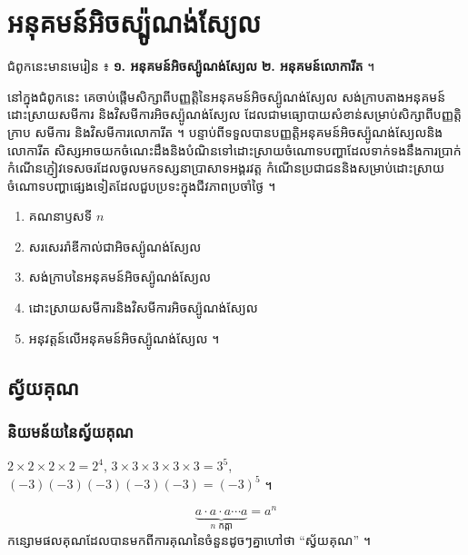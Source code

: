 \chapter{អនុគមន៍អិចស្ប៉ូណង់ស្យែល}

\begin{note}
ជំពូកនេះមានមេរៀន ៖ \textbf{១. អនុគមន៍អិចស្ប៉ូណង់ស្យែល} \quad \textbf{២. អនុគមន៍លោការីត} ។

នៅក្នុងជំពូកនេះ គេចាប់ផ្ដើមសិក្សាពីបញ្ញត្តិនៃអនុគមន៍អិចស្ប៉ូណង់ស្យែល សង់ក្រាបតាងអនុគមន៍ ដោះស្រាយសមីការ និងវិសមីការអិចស្ប៉ូណង់ស្យែល ដែលជាមធ្យោបាយសំខាន់សម្រាប់សិក្សាពីបញ្ញត្តិ ក្រាប សមីការ និងវិសមីការលោការីត ។ បន្ទាប់ពីទទួលបានបញ្ញត្តិអនុគមន៍អិចស្ប៉ូណង់ស្យែលនិងលោការីត សិស្សអាចយកចំណេះដឹងនិងបំណិនទៅដោះស្រាយចំណោទបញ្ហាដែលទាក់ទងនឹងការប្រាក់ កំណើនភ្ញៀវទេសចរដែលចូលមកទស្សនាប្រាសាទអង្គរវត្ត កំណើនប្រជាជននិងសម្រាប់ដោះស្រាយចំណោទបញ្ហាផ្សេងទៀតដែលជួបប្រទះក្នុងជីវភាពប្រចាំថ្ងៃ ។
\end{note}

\begin{objBox}[វត្ថុបំណង]
\begin{enumerate}[1]
  \item គណនាឫសទី $n$
  \item សរសេររ៉ាឌីកាល់ជាអិចស្ប៉ូណង់ស្យែល
  \item សង់ក្រាបនៃអនុគមន៍អិចស្ប៉ូណង់ស្យែល
  \item ដោះស្រាយសមីការនិងវិសមីការអិចស្ប៉ូណង់ស្យែល
  \item អនុវត្តន៍លើអនុគមន៍អិចស្ប៉ូណង់ស្យែល ។
\end{enumerate}
\end{objBox}

\section{ស្វ័យគុណ}
\subsection{និយមន័យនៃស្វ័យគុណ}

\begin{example}[ឧទាហរណ៍]
$2\times 2\times 2\times 2 = 2^4$, \quad $3\times 3\times 3\times 3\times 3 = 3^5$, \quad $(-3)(-3)(-3)(-3)(-3) = (-3)^5$ ។
\end{example}

\begin{formulaBox}[ជាទូទៅ]
\[
\underbrace{a\cdot a\cdot a\cdots a}_{n \text{ កត្តា}} = a^n
\]
កន្សោមផលគុណដែលបានមកពីការគុណនៃចំនួនដូចៗគ្នាហៅថា “ស្វ័យគុណ” ។
\end{formulaBox}

